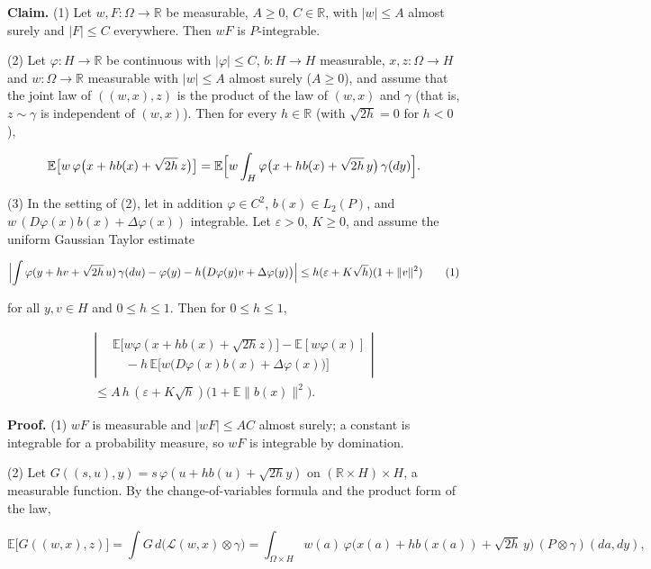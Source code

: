 \documentclass[11pt,a4paper]{article}
\begin{document}
\textbf{Claim.} (1) Let \(w,F:\Omega\to\mathbb R\) be measurable, \(A\ge0\), \(C\in\mathbb R\), with \(|w|\le A\) almost surely and \(|F|\le C\) everywhere. Then \(wF\) is \(P\)-integrable.




(2) Let \(\varphi:H\to\mathbb R\) be continuous with \(|\varphi|\le C\), \(b:H\to H\) measurable, \(x,z:\Omega\to H\) and \(w:\Omega\to\mathbb R\) measurable with \(|w|\le A\) almost surely (\(A\ge0\)), and assume that the joint law of \(((w,x),z)\) is the product of the law of \((w,x)\) and \(\gamma\) (that is, \(z\sim\gamma\) is independent of \((w,x)\)). Then for every \(h\in\mathbb R\) (with \(\sqrt{2h}=0\) for \(h<0\)),


\[\mathbb E\bigl[w\,\varphi\bigl(x+hb(x)+\sqrt{2h}\,z\bigr)\bigr]=\mathbb E\Bigl[w\int_H\varphi\bigl(x+hb(x)+\sqrt{2h}\,y\bigr)\,\gamma(dy)\Bigr].\]


(3) In the setting of (2), let in addition \(\varphi\in C^2\), \(b(x)\in L_2(P)\), and \(w\,(D\varphi(x)b(x)+\Delta\varphi(x))\) integrable. Let \(\varepsilon>0\), \(K\ge0\), and assume the uniform Gaussian Taylor estimate


\[\Bigl|\int\varphi(y+hv+\sqrt{2h}\,u)\,\gamma(du)-\varphi(y)-h\bigl(D\varphi(y)v+\Delta\varphi(y)\bigr)\Bigr|\le h(\varepsilon+K\sqrt h)(1+\|v\|^2)\qquad(1)\]


for all \(y,v\in H\) and \(0\le h\le1\). Then for \(0\le h\le1\),


\[\begin{gathered}
\left|\begin{aligned}
&\mathbb E\bigl[w\varphi(x+hb(x)+\sqrt{2h}z)\bigr]-\mathbb E[w\varphi(x)]\\
&\quad-h\,\mathbb E\bigl[w\bigl(D\varphi(x)b(x)+\Delta\varphi(x)\bigr)\bigr]
\end{aligned}\right|\\
\le A\,h\,(\varepsilon+K\sqrt h)\bigl(1+\mathbb E\|b(x)\|^2\bigr).
\end{gathered}\]


\textbf{Proof.} (1) \(wF\) is measurable and \(|wF|\le AC\) almost surely; a constant is integrable for a probability measure, so \(wF\) is integrable by domination.




(2) Let \(G((s,u),y)=s\,\varphi(u+hb(u)+\sqrt{2h}y)\) on \((\mathbb R\times H)\times H\), a measurable function. By the change-of-variables formula and the product form of the law,


\[\mathbb E\bigl[G((w,x),z)\bigr]=\int G\,d\bigl(\mathcal L(w,x)\otimes\gamma\bigr)=\int_{\Omega\times H}w(a)\,\varphi\bigl(x(a)+hb(x(a))+\sqrt{2h}\,y\bigr)\,(P\otimes\gamma)(da,dy),\]
\end{document}
